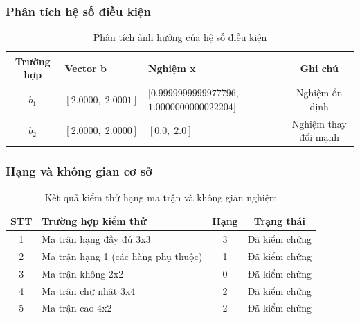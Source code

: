 \newpage

\subsubsection{Phân tích hệ số điều kiện}

\begin{table}[h!]
    \centering
    \renewcommand{\arraystretch}{1.3}
    \setlength{\tabcolsep}{6pt}
    \begin{tabular}{|c|p{3.5cm}|p{4cm}|c|}
        \hline
        \rowcolor[rgb]{0.8, 0.9, 1.0}
        \textbf{Trường hợp} & \textbf{Vector b} & \textbf{Nghiệm x} & \textbf{Ghi chú} \\ \hline
        
        $b_1$ & $[2.0000,\; 2.0001]$ & \parbox[c]{4cm}{\centering $[0.9999999999977796,$ \\ $1.0000000000022204]$} & Nghiệm ổn định \\ \hline
        
        $b_2$ & $[2.0000,\; 2.0000]$ & $[0.0,\; 2.0]$ & Nghiệm thay đổi mạnh \\ \hline

    \end{tabular}
    \caption{Phân tích ảnh hưởng của hệ số điều kiện}
\end{table}

\subsubsection{Hạng và không gian cơ sở}

\begin{table}[h!]
    \centering
    \renewcommand{\arraystretch}{1.3}
    \setlength{\tabcolsep}{6pt}
    \begin{tabular}{|c|p{7.5cm}|c|c|}
        \hline
        \rowcolor[rgb]{0.8, 0.9, 1.0}
        \textbf{STT} & \textbf{Trường hợp kiểm thử} & \textbf{Hạng} & \textbf{Trạng thái} \\ \hline
        
        1 & Ma trận hạng đầy đủ 3x3 & 3 & Đã kiểm chứng \\ \hline
        2 & Ma trận hạng 1 (các hàng phụ thuộc) & 1 & Đã kiểm chứng \\ \hline
        3 & Ma trận không 2x2 & 0 & Đã kiểm chứng \\ \hline
        4 & Ma trận chữ nhật 3x4 & 2 & Đã kiểm chứng \\ \hline
        5 & Ma trận cao 4x2 & 2 & Đã kiểm chứng \\ \hline

    \end{tabular}
    \caption{Kết quả kiểm thử hạng ma trận và không gian nghiệm}
\end{table}
